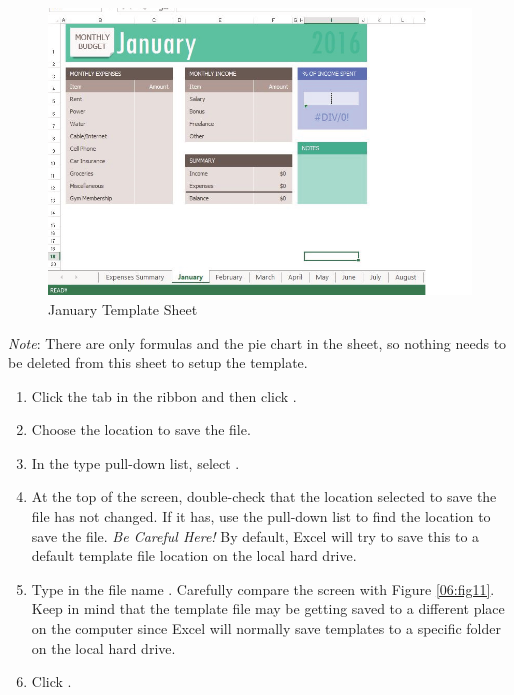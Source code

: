 \begin{figure}[H]
	\centering
	\includegraphics[width=\maxwidth{.95\linewidth}]{gfx/ch06_fig10}
	\caption{January Template Sheet}
	\label{06:fig10}
\end{figure}

\textit{Note}: There are only formulas and the pie chart in the  sheet, so nothing needs to be deleted from this sheet to setup the template.

\begin{enumerate}
	\item Click the  tab in the ribbon and then click .
	\item Choose the location to save the file.
	\item In the  type pull-down list, select .
	\item At the top of the screen, double-check that the location selected to save the file has not changed. If it has, use the pull-down list to find the location to save the file. \textit{Be Careful Here!} By default, Excel will try to save this to a default template file location on the local hard drive.
	\item Type in the file name . Carefully compare the screen with Figure \ref{06:fig11}. Keep in mind that the template file may be getting saved to a different place on the computer since Excel will normally save templates to a specific folder on the local hard drive.
	\item Click .
\end{enumerate}

